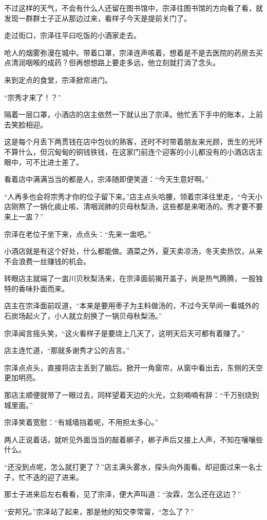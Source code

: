 不过这样的天气，不会有什么人还留在图书馆中，宗泽往图书馆的方向看了看，就发现一群群士子正从那边过来，看样子今天是提前关门了。

走过街口，宗泽往平曰吃饭的小酒家走去。

呛人的烟雾弥漫在城中。带着口罩，宗泽连声咳着，想着是不是去医院的药房去买点清润咽喉的成药？但再想想路上要走多远，他立刻就打消了念头。

来到定点的食堂，宗泽掀帘进门。

“宗秀才来了！？”

隔着一层口罩，小酒店的店主依然一下就认出了宗泽。他忙丢下手中的账本，上前去笑脸相迎。

这是每个月丢下两贯钱在店中包伙的熟客，还时不时带着朋友来光顾，贡生的光环不算什么，但沉甸甸的铜钱铁钱，在这家门前连个迎客的小儿都没有的小酒店店主眼中，可不比进士差了。

看着店中满满当当的都是人，宗泽随即便笑道：“今天生意好啊。”

“人再多也会将宗秀才你的位子留下来。”店主点头哈腰，领着宗泽往里走，“今天小店刚熬了一锅化痰止咳、清咽润肺的贝母秋梨汤，这些都是来喝汤的。秀才要不要来上一盅？”

宗泽在老位子坐下来，点点头：“先来一盅吧。”

小酒店就是有这个好处，什么都能做。酒菜之外，夏天卖凉汤，冬天卖热饮，从来不会浪费一丝赚钱的机会。

转眼店主就端了一盅川贝秋梨汤来，在宗泽面前揭开盖子，尚是热气腾腾，一股独特的香味扑面而来。

店主在宗泽面前叹道，“本来是要用枣子为主料做汤的，不过今天早间一看城外的石炭场起火了，小人就立刻换了一锅贝母秋梨汤。”

宗泽闻言摇头笑，“这火看样子是要烧上几天了，这明天后天可都有着赚了。”

店主连忙道，“那就多谢秀才公的吉言。”

宗泽点点头，直接将店主丢到了脑后。掀开一角窗帘，从窗中看出去，东侧的天空更加明亮。

那店主顺便就带了一眼过去，同样望着天边的火光，立刻喃喃有辞：“千万别烧到城里面。”

宗泽笑着宽慰：“有城墙挡着呢，不用担太多心。”

两人正说着话，就听见外面当当的敲着梆子，梆子声后又接上人声，不知在嚷嚷些什么。

“还没到点呢，怎么就打更了？”店主满头雾水，探头向外面看。却迎面过来一名士子，忙不迭的迎了进来。

那士子进来后左右看看，见了宗泽，便大声叫道：“汝霖，怎么还在这边？”

“安邦兄。”宗泽站了起来，那是他的知交李常甯，“怎么了？”

